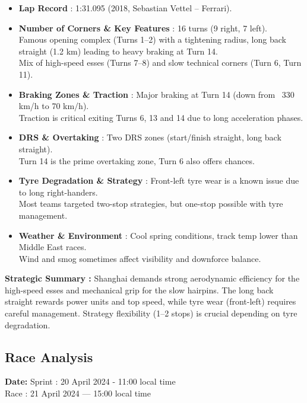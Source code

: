 \begin{itemize}
    \item \textbf{Lap Record} : 1:31.095 (2018, Sebastian Vettel – Ferrari).

    \item \textbf{Number of Corners \& Key Features} : 16 turns (9 right, 7 left). \\
    Famous opening complex (Turns 1–2) with a tightening radius, long back straight (1.2 km) leading to heavy braking at Turn 14. \\
    Mix of high-speed esses (Turns 7–8) and slow technical corners (Turn 6, Turn 11).

    \item \textbf{Braking Zones \& Traction} : Major braking at Turn 14 (down from ~330 km/h to 70 km/h). \\
    Traction is critical exiting Turns 6, 13 and 14 due to long acceleration phases.

    \item \textbf{DRS \& Overtaking} : Two DRS zones (start/finish straight, long back straight). \\
    Turn 14 is the prime overtaking zone, Turn 6 also offers chances.

    \item \textbf{Tyre Degradation \& Strategy} : Front-left tyre wear is a known issue due to long right-handers. \\
    Most teams targeted two-stop strategies, but one-stop possible with tyre management.

    \item \textbf{Weather \& Environment} : Cool spring conditions, track temp lower than Middle East races. \\
    Wind and smog sometimes affect visibility and downforce balance.
\end{itemize}

\textbf{Strategic Summary :}  
Shanghai demands strong aerodynamic efficiency for the high-speed esses and mechanical grip for the slow hairpins. The long back straight rewards power units and top speed, while tyre wear (front-left) requires careful management. Strategy flexibility (1–2 stops) is crucial depending on tyre degradation.

\subsection{Race Analysis}

\textbf{Date:} Sprint : 20 April 2024 - 11:00 local time\\
Race : 21 April 2024 — 15:00 local time 

